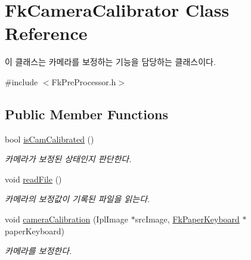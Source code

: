 \hypertarget{class_fk_camera_calibrator}{}\section{Fk\+Camera\+Calibrator Class Reference}
\label{class_fk_camera_calibrator}


이 클래스는 카메라를 보정하는 기능을 담당하는 클래스이다.  




{\ttfamily \#include $<$Fk\+Pre\+Processor.\+h$>$}

\subsection*{Public Member Functions}
\begin{DoxyCompactItemize}
\item 
\hypertarget{class_fk_camera_calibrator_a22a979b16e08877e38496d07b6feb70a}{}bool \hyperlink{class_fk_camera_calibrator_a22a979b16e08877e38496d07b6feb70a}{is\+Cam\+Calibrated} ()\label{class_fk_camera_calibrator_a22a979b16e08877e38496d07b6feb70a}

\begin{DoxyCompactList}\small\item\em 카메라가 보정된 상태인지 판단한다. \end{DoxyCompactList}\item 
\hypertarget{class_fk_camera_calibrator_ab5e9f77665b4bea88648214a8ac75043}{}void \hyperlink{class_fk_camera_calibrator_ab5e9f77665b4bea88648214a8ac75043}{read\+File} ()\label{class_fk_camera_calibrator_ab5e9f77665b4bea88648214a8ac75043}

\begin{DoxyCompactList}\small\item\em 카메라의 보정값이 기록된 파일을 읽는다. \end{DoxyCompactList}\item 
\hypertarget{class_fk_camera_calibrator_ab90873c9a16898d4319b9492384aef82}{}void \hyperlink{class_fk_camera_calibrator_ab90873c9a16898d4319b9492384aef82}{camera\+Calibration} (Ipl\+Image $\ast$src\+Image, \hyperlink{class_fk_paper_keyboard}{Fk\+Paper\+Keyboard} $\ast$paper\+Keyboard)\label{class_fk_camera_calibrator_ab90873c9a16898d4319b9492384aef82}

\begin{DoxyCompactList}\small\item\em 카메라를 보정한다. \end{DoxyCompactList}\end{DoxyCompactItemize}



